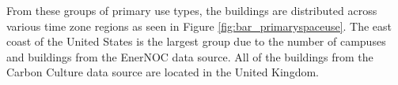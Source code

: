 From these groups of primary use types, the buildings are distributed across various time zone regions as seen in Figure \ref{fig:bar_primaryspaceuse}. The east coast of the United States is the largest group due to the number of campuses and buildings from the EnerNOC data source. All of the buildings from the Carbon Culture data source are located in the United Kingdom.